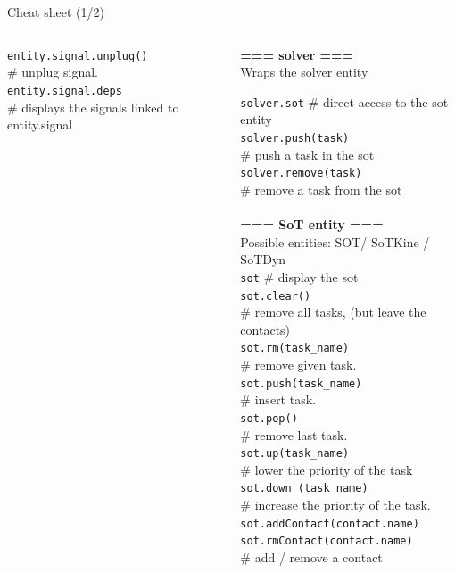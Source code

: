 \begin{frame} {Cheat sheet (1/2)}
\begin{columns}
\begin{column}[t]{5cm}
{\texttt{entity.signal.unplug()}\\
\# unplug signal.\\

\texttt{entity.signal.deps}\\
\# displays the signals linked to entity.signal\\
~\\
}



  \end{column}
  \begin{column}[t]{5cm}
{\tiny
\textbf{=== solver ===}~\\
Wraps the solver entity

\texttt{solver.sot}
\# direct access  to the sot entity\\
\texttt{solver.push(task)}\\
\# push a task in the sot\\
\texttt{solver.remove(task)}\\
\# remove a task from the sot\\
~\\

\textbf{=== SoT entity ===}\\
Possible entities: SOT/ SoTKine / SoTDyn\\

\texttt{sot}  	\# display the sot\\
\texttt{sot.clear()}\\
\# remove all tasks, (but leave the contacts)\\
\texttt{sot.rm(task\_name)}\\
\# remove given task.\\
\texttt{sot.push(task\_name)}\\
\# insert task.\\
\texttt{sot.pop()}\\
\# remove last task.\\
\texttt{sot.up(task\_name)}\\
\# lower the priority of the task\\
\texttt{sot.down (task\_name)}\\
\# increase the priority of the task.\\
\texttt{sot.addContact(contact.name)}\\
\texttt{sot.rmContact(contact.name)}\\
\# add / remove a contact\\
}


  \end{column}
 \end{columns}
\end{frame}




